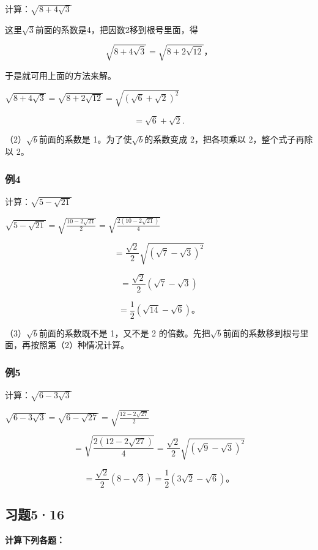 计算：\(\sqrt{8 + 4\sqrt{3}}\)

 这里\(\sqrt{3}\)前面的系数是4，把因数2移到根号里面，得

\[
\sqrt {8 + 4 \sqrt {3}} = \sqrt {8 + 2 \sqrt {12}}\text{，}
\]

于是就可用上面的方法来解。

\(\sqrt{8 + 4\sqrt{3}} = \sqrt{8 + 2\sqrt{12}} = \sqrt{(\sqrt{6} + \sqrt{2})^2}\)

\[
= \sqrt {6} + \sqrt {2}.
\]

（2）\(\sqrt{b}\)前面的系数是 1。为了使\(\sqrt{b}\)的系数变成
2，把各项乘以 2，整个式子再除以 2。

\subsubsection{例4}

计算：\(\sqrt{5 - \sqrt{21}}\)

\(\sqrt{5 - \sqrt{21}} = \sqrt{\frac{10 - 2\sqrt{21}}{2}} = \sqrt{\frac{2(10 - 2\sqrt{21})}{4}}\)

\[
= \frac{\sqrt {2}}{2} \sqrt {(\sqrt {7} - \sqrt {3}) ^ {2}}
\]

\[
= \frac{\sqrt {2}}{2} (\sqrt {7} - \sqrt {3})
\]

\[
= \frac{1}{2} (\sqrt {14} - \sqrt {6})\text{。}
\]

（3）\(\sqrt{b}\)前面的系数既不是 1，又不是 2
的倍数。先把\(\sqrt{b}\)前面的系数移到根号里面，再按照第（2）种情况计算。

\subsubsection{例5}

计算：\(\sqrt{6 - 3\sqrt{3}}\)

\(\sqrt{6 - 3\sqrt{3}} = \sqrt{6 - \sqrt{27}} = \sqrt{\frac{12 - 2\sqrt{27}}{2}}\)

\[
= \sqrt {\frac{2 (12 - 2 \sqrt {27})}{4}} = \frac{\sqrt {2}}{2} \sqrt {(\sqrt {9} - \sqrt {3}) ^ {2}}
\]

\[
= \frac{\sqrt {2}}{2} (8 - \sqrt {3}) = \frac{1}{2} (3 \sqrt {2} - \sqrt {6})\text{。}
\]

\subsection{习题5·16}

\textbf{计算下列各题：}

